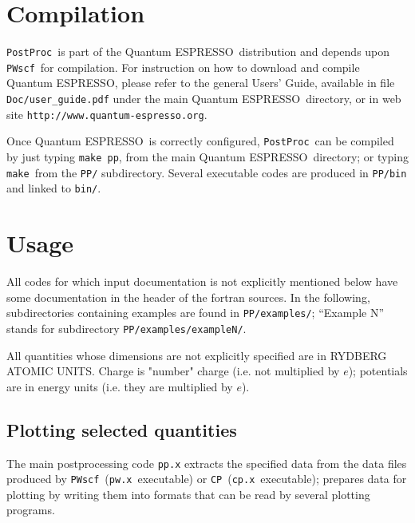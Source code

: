 \documentclass[12pt,a4paper]{article}
\def\qe{{\sc Quantum ESPRESSO}}
\def\pwx{\texttt{pw.x}}
\def\cpx{\texttt{cp.x}}
\def\PWscf{\texttt{PWscf}}
\def\CP{\texttt{CP}}
\def\PostProc{\texttt{PostProc}}
\def\make{\texttt{make}}
\begin{document}


\section{Compilation}

\PostProc \ is part of the \qe \ distribution
and depends upon \PWscf\ for compilation.
For instruction on how to download and compile \qe, please refer 
to the general Users' Guide, available in file \texttt{Doc/user\_guide.pdf}
under the main \qe\ directory, or in web site 
\texttt{http://www.quantum-espresso.org}.

Once \qe\ is correctly configured, \PostProc\ can be compiled by
just typing \texttt{make pp}, from the main \qe\ directory;
or typing \make\ from the \texttt{PP/} subdirectory.
Several executable codes are produced in \texttt{PP/bin}
and linked to \texttt{bin/}.

\section{Usage}

All codes for which input documentation is not explicitly mentioned below
have some documentation in the header of the fortran sources.
In the following, subdirectories containing examples are found in
\texttt{PP/examples/}; ``Example N'' stands for subdirectory 
\texttt{PP/examples/exampleN/}.

All quantities whose dimensions are not explicitly specified are in
RYDBERG ATOMIC UNITS. Charge is "number" charge (i.e. not multiplied 
by $e$); potentials are in energy units (i.e. they are multiplied by 
$e$).

\subsection{Plotting selected quantities}
  
The main postprocessing code \texttt{pp.x} extracts the specified data
from the data files produced by \PWscf\ (\pwx\ executable) or \CP\ 
(\cpx\ executable); prepares data for plotting by writing them into 
formats that can be read by several plotting programs.
\end{document}
